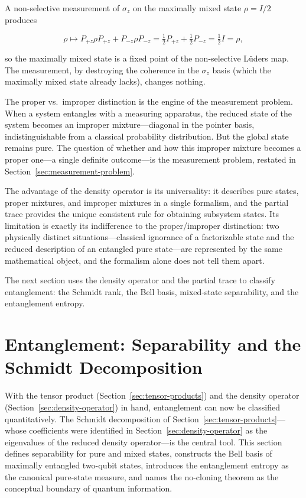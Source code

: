 A non-selective measurement of $\sigma_z$ on the maximally mixed state $\rho = I/2$ produces
\begin{linenomath}
\begin{equation}
\rho \mapsto P_{+z}\rho P_{+z} + P_{-z}\rho P_{-z}
= \tfrac12 P_{+z} + \tfrac12 P_{-z} = \tfrac12 I = \rho,
\end{equation}
\end{linenomath}
so the maximally mixed state is a fixed point of the non-selective L\"uders map. The measurement, by destroying the coherence in the $\sigma_z$ basis (which the maximally mixed state already lacks), changes nothing.

The proper vs.\ improper distinction is the engine of the measurement problem. When a system entangles with a measuring apparatus, the reduced state of the system becomes an improper mixture---diagonal in the pointer basis, indistinguishable from a classical probability distribution. But the global state remains pure. The question of whether and how this improper mixture becomes a proper one---a single definite outcome---is the measurement problem, restated in Section~\ref{sec:measurement-problem}.

The advantage of the density operator is its universality: it describes pure states, proper mixtures, and improper mixtures in a single formalism, and the partial trace provides the unique consistent rule for obtaining subsystem states. Its limitation is exactly its indifference to the proper/improper distinction: two physically distinct situations---classical ignorance of a factorizable state and the reduced description of an entangled pure state---are represented by the same mathematical object, and the formalism alone does not tell them apart.

The next section uses the density operator and the partial trace to classify entanglement: the Schmidt rank, the Bell basis, mixed-state separability, and the entanglement entropy.
\section{Entanglement: Separability and the Schmidt Decomposition}
\label{sec:entanglement}

With the tensor product (Section~\ref{sec:tensor-products}) and the density operator (Section~\ref{sec:density-operator}) in hand, entanglement can now be classified quantitatively. The Schmidt decomposition of Section~\ref{sec:tensor-products}---whose coefficients were identified in Section~\ref{sec:density-operator} as the eigenvalues of the reduced density operator---is the central tool. This section defines separability for pure and mixed states, constructs the Bell basis of maximally entangled two-qubit states, introduces the entanglement entropy as the canonical pure-state measure, and names the no-cloning theorem as the conceptual boundary of quantum information.

